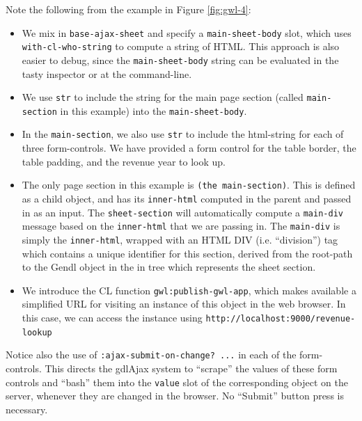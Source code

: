 \documentclass [11pt]{book}
\begin{document}
Note the following from the example in Figure 
\ref{fig:gwl-4}:

\begin{itemize}

\item We mix in \texttt{base-ajax-sheet} and specify a \texttt{main-sheet-body} slot, which uses \texttt{with-cl-who-string} to compute a string
                   of HTML. This approach is also easier to debug,
                   since the \texttt{main-sheet-body} string
                   can be evaluated in the tasty inspector or at the
                   command-line.

\item We use \texttt{str} to include the string for the main page
        section (called \texttt{main-section} in this example) into the \texttt{main-sheet-body}.

\item In the \texttt{main-section}, we also
        use \texttt{str} to include the html-string for each of
        three form-controls. We have provided a form control for the
        table border, the table padding, and the revenue year to look
        up.

\item The only page section in this example is \texttt{(the main-section)}. This is defined as a child object, and has its \texttt{inner-html} computed in the parent and passed in as an input. The \texttt{sheet-section} will automatically compute a \texttt{main-div} message based on the \texttt{inner-html} that we are passing in. The \texttt{main-div} is simply the \texttt{inner-html}, wrapped with
               an HTML DIV (i.e. ``division'') tag which contains a unique
               identifier for this section, derived from the root-path
               to the Gendl object in the in tree which represents the
               sheet section.

\item We introduce the CL function \texttt{gwl:publish-gwl-app}, which makes available a simplified URL for visiting an instance of this
        object in the web browser. In this case, we can access the
        instance using \texttt{http://localhost:9000/revenue-lookup}

\end{itemize}





Notice also the use of \texttt{:ajax-submit-on-change? ...} in each of the form-controls. This directs the gdlAjax
	  system to ``scrape'' the values of these form controls
	  and ``bash'' them into the \texttt{value} slot of the corresponding object on the server, whenever
they are changed in the browser. No ``Submit'' button press is
necessary.
\end{document}
